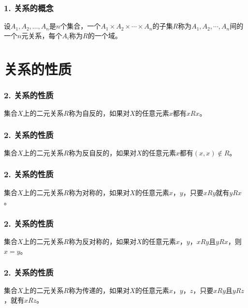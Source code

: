 \documentclass{beamer}
\begin{document}
\begin{CJK*}{UTF8}{gbsn}
\begin{frame}
  \frametitle{1. 关系的概念}
  \begin{Def}
    设$A_1, A_2, \ldots, A_n$是$n$个集合，一个$A_1\times A_2 \times \cdots \times A_n$的子集$R$称为$A_1, A_2, \cdots, A_n$间的一个\alert{$n$元关系}，每个$A_i$称为$R$的一个域。
  \end{Def}
\end{frame}
\section{关系的性质}
\begin{frame}
  \frametitle{2. 关系的性质}
  \begin{Def}
    集合$X$上的二元关系$R$称为\alert{自反}的，如果对$X$的任意元素$x$都有$xRx$。
  \end{Def}
\end{frame}

\begin{frame}
  \frametitle{2. 关系的性质}
  \begin{Def}
   集合$X$上的二元关系$R$称为\alert{反自反}的，如果对$X$的任意元素$x$都有$(x,x) \notin R$。
  \end{Def}
\end{frame}
\begin{frame}
  \frametitle{2. 关系的性质}
  \begin{Def}
    集合$X$上的二元关系$R$称为\alert{对称}的，如果对$X$的任意元素$x$，$y$，只要$xRy$就有$yRx$。
  \end{Def}
\end{frame}
\begin{frame}
  \frametitle{2. 关系的性质}
  \begin{Def}
         集合$X$上的二元关系$R$称为\alert{反对称}的，如果对$X$的任意元素$x$，$y$，$xRy$且$yRx$，则$x=y$。    
  \end{Def}
\end{frame}
\begin{frame}
  \frametitle{2. 关系的性质}
  \begin{Def}
        集合$X$上的二元关系$R$称为\alert{传递}的，如果对$X$的任意元素$x$，$y$，$z$，只要$xRy$且$yRz$，就有$xRz$。
  \end{Def}
\end{frame}

\end{CJK*}
\end{document}
